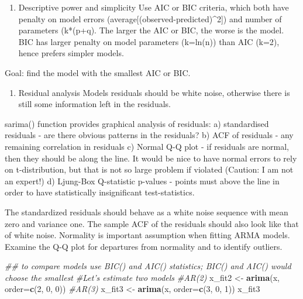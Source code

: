 \documentclass[]{book}
\newenvironment{Shaded}{\begin{snugshade}}{\end{snugshade}}
\newcommand{\CommentTok}[1]{\textcolor[rgb]{0.56,0.35,0.01}{\textit{#1}}}
\newcommand{\DataTypeTok}[1]{\textcolor[rgb]{0.13,0.29,0.53}{#1}}
\newcommand{\DecValTok}[1]{\textcolor[rgb]{0.00,0.00,0.81}{#1}}
\newcommand{\KeywordTok}[1]{\textcolor[rgb]{0.13,0.29,0.53}{\textbf{#1}}}
\newcommand{\NormalTok}[1]{#1}
\newcommand{\StringTok}[1]{\textcolor[rgb]{0.31,0.60,0.02}{#1}}
\providecommand{\tightlist}{%
  \setlength{\itemsep}{0pt}\setlength{\parskip}{0pt}}
\begin{document}
\begin{enumerate}
\def\labelenumi{\arabic{enumi})}
\tightlist
\item
  Descriptive power and simplicity
  Use AIC or BIC criteria, which both have penalty on model errors (average{[}(observed-predicted)\^{}2{]}) and number of parameters (k*(p+q). The larger the AIC or BIC, the worse is the model. BIC has larger penalty on model parameters (k=ln(n)) than AIC (k=2), hence prefers simpler models.
\end{enumerate}

Goal: find the model with the smallest AIC or BIC.

\begin{enumerate}
\def\labelenumi{\arabic{enumi})}
\setcounter{enumi}{1}
\tightlist
\item
  Residual analysis
  Models residuals should be white noise, otherwise there is still some information left in the residuals.
\end{enumerate}

sarima() function provides graphical analysis of residuals:
a) standardised residuals - are there obvious patterns in the residuals?
b) ACF of residuals - any remaining correlation in residuals
c) Normal Q-Q plot - if residuals are normal, then they should be along the line. It would be nice to have normal errors to rely on t-distribution, but that is not so large problem if violated (Caution: I am not an expert!)
d) Ljung-Box Q-statistic p-values - points must above the line in order to have statistically insignificant test-statistics.

The standardized residuals should behave as a white noise sequence with mean zero and variance one.
The sample ACF of the residuals should also look like that of white noise.
Normality is important assumption when fitting ARMA models. Examine the Q-Q plot for departures from normality and to identify outliers.

\begin{Shaded}
\begin{Highlighting}[]
\CommentTok{## to compare models use BIC() and AIC() statistics; BIC() and AIC() would choose the smallest}
\CommentTok{#Let's estimate two models}
\CommentTok{#AR(2)}
\NormalTok{x_fit2 <-}\StringTok{ }\KeywordTok{arima}\NormalTok{(x, }\DataTypeTok{order=}\KeywordTok{c}\NormalTok{(}\DecValTok{2}\NormalTok{, }\DecValTok{0}\NormalTok{, }\DecValTok{0}\NormalTok{))}
\CommentTok{#AR(3)}
\NormalTok{x_fit3 <-}\StringTok{ }\KeywordTok{arima}\NormalTok{(x, }\DataTypeTok{order=}\KeywordTok{c}\NormalTok{(}\DecValTok{3}\NormalTok{, }\DecValTok{0}\NormalTok{, }\DecValTok{1}\NormalTok{))}
\NormalTok{x_fit3}
\end{Highlighting}
\end{Shaded}
\end{document}

